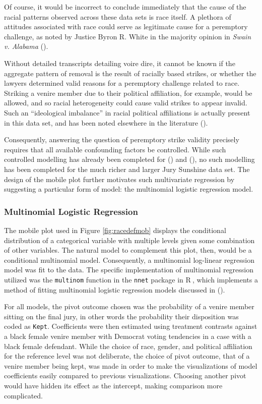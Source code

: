 \documentclass[12pt]{article}
\newcommand*{\R}{\textsf{R}$~$}
\begin{document}
Of course, it would be incorrect to conclude immediately that the cause of the racial patterns observed across these data sets is race itself. A plethora of attitudes associated with race could serve as legitimate cause for a peremptory challenge, as noted by Justice Byron R. White in the majority opinion in \textit{Swain v. Alabama} (\cite{swainvalabama}).

Without detailed transcripts detailing voire dire, it cannot be known if the aggregate pattern of removal is the result of racially based strikes, or whether the lawyers determined valid reasons for a peremptory challenge related to race. Striking a venire member due to their political affiliation, for example, would be allowed, and so racial heterogeneity could cause valid strikes to appear invalid. Such an ``ideological imbalance'' in racial political affiliations is actually present in this data set, and has been noted elsewhere in the literature (\cite{revesz2016}).

Consequently, answering the question of peremptory strike validity precisely requires that all available confounding factors be controlled. While such controlled modelling has already been completed for (\cite{StubbornLegacy}) and (\cite{PerempChalMurder}), no such modelling has been completed for the much richer and larger Jury Sunshine data set. The design of the mobile plot further motivates such multivariate regression by suggesting a particular form of model: the multinomial logistic regression model.

\subsubsection{Multinomial Logistic Regression}

The mobile plot used in Figure \ref{fig:racedefmob} displays the conditional distribution of a categorical variable with multiple levels given some combination of other variables. The natural model to complement this plot, then, would be a conditional multinomial model. Consequently, a multinomial log-linear regression model was fit to the data. The specific implementation of multinomial regression utilized was the \texttt{multinom} function in the \texttt{nnet} package in \R, which implements a method of fitting multinomial logistic regression models discussed in (\cite{nnet}).

For all models, the pivot outcome chosen was the probability of a venire member sitting on the final jury, in other words the probability their disposition was coded as \texttt{Kept}. Coefficients were then estimated using treatment contrasts against a black female venire member with Democrat voting tendencies in a case with a black female defendant. While the choice of race, gender, and political affiliation for the reference level was not deliberate, the choice of pivot outcome, that of a venire member being kept, was made in order to make the visualizations of model coefficients easily compared to previous visualizations. Choosing another pivot would have hidden its effect as the intercept, making comparison more complicated.
\end{document}
